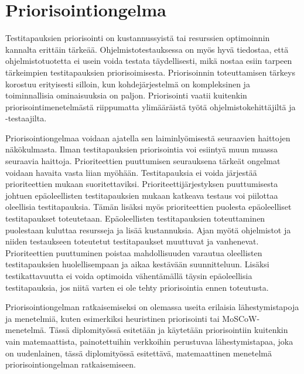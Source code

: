 \section{Priorisointiongelma} \label{ch:08_priorisointiongelma}

  Testitapauksien priorisointi on kustannussyistä tai resurssien optimoinnin kannalta erittäin tärkeää.
  Ohjelmistotestauksessa on myös hyvä tiedostaa, että ohjelmistotuotetta ei usein voida testata täydellisesti, mikä nostaa esiin tarpeen tärkeimpien testitapauksien priorisoimisesta.
  Priorisoinnin toteuttamisen tärkeys korostuu erityisesti silloin, kun kohdejärjestelmä on kompleksinen ja toiminnallisia ominaisuuksia on paljon.
  Priorisointi vaatii kuitenkin priorisointimenetelmästä riippumatta ylimääräistä työtä ohjelmistokehittäjiltä ja -testaajilta.

  Priorisointiongelmaa voidaan ajatella sen laiminlyömisestä seuraavien haittojen näkökulmasta.
  Ilman testitapauksien priorisointia voi esiintyä muun muassa seuraavia haittoja.
  Prioriteettien puuttumisen seurauksena tärkeät ongelmat voidaan havaita vasta liian myöhään.
  Testitapauksia ei voida järjestää prioriteettien mukaan suoritettaviksi.
  Prioriteettijärjestyksen puuttumisesta johtuen epäoleellisten testitapauksien mukaan katkeava testaus voi piilottaa oleellisia testitapauksia.
  Tämän lisäksi myös prioriteettien puolesta epäoleelliset testitapaukset toteutetaan.
  Epäoleellisten testitapauksien toteuttaminen puolestaan kuluttaa resursseja ja lisää kustannuksia.
  Ajan myötä ohjelmistot ja niiden testaukseen toteutetut testitapaukset muuttuvat ja vanhenevat.
  Prioriteettien puuttuminen poistaa mahdollisuuden varautua oleellisten testitapauksien huolellisempaan ja aikaa kestävään suunnitteluun.
  Lisäksi testikattavuutta ei voida optimoida vähentämällä täysin epäoleellisia testitapauksia, jos niitä varten ei ole tehty priorisointia ennen toteutusta.

  Priorisointiongelman ratkaisemiseksi on olemassa useita erilaisia lähestymistapoja ja menetelmiä, kuten esimerkiksi heuristinen priorisointi tai MoSCoW-menetelmä.
  Tässä diplomityössä esitetään ja käytetään priorisointiin kuitenkin vain matemaattista, painotettuihin verkkoihin perustuvaa lähestymistapaa, joka on uudenlainen, tässä diplomityössä esitettävä, matemaattinen menetelmä priorisointiongelman ratkaisemiseen.
